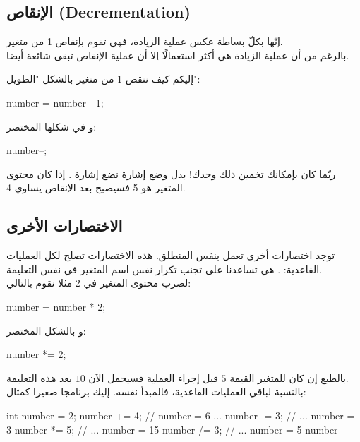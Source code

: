\subsection{الإنقاص (\textenglish{Decrementation})}

إنّها بكلّ بساطة عكس عملية الزيادة، فهي تقوم بإنقاص 1 من متغير.\\
بالرغم من أن عملية الزيادة هي أكثر استعمالًا إلا أن عملية الإنقاص تبقى شائعة أيضا.

إليكم كيف ننقص 1 من متغير بالشكل "الطويل":

\begin{Csource}
  number = number - 1;
\end{Csource}

و في شكلها المختصر:

\begin{Csource}
  number--;
\end{Csource}

ربّما كان بإمكانك تخمين ذلك وحدك! بدل وضع إشارة
\InlineCode{++}
نضع إشارة
\InlineCode{{-}{-}}.
إذا كان محتوى المتغير هو 5 فسيصبح بعد الإنقاص يساوي 4.

\subsection{الاختصارات الأخرى}

توجد اختصارات أخرى تعمل بنفس المنطلق. هذه الاختصارات تصلح لكل العمليات القاعدية:
\InlineCode{+}
\InlineCode{-}
\InlineCode{*}
\InlineCode{/}
\InlineCode{\%}.
هي تساعدنا على تجنب تكرار نفس اسم المتغير في نفس التعليمة.\\
لضرب محتوى المتغير في 2 مثلا نقوم بالتالي:

\begin{Csource}
  number = number * 2;
\end{Csource}

و بالشكل المختصر:

\begin{Csource}
  number *= 2;
\end{Csource}

بالطبع إن كان للمتغير القيمة $ 5 $ قبل إجراء العملية فسيحمل الآن $ 10 $ بعد هذه التعليمة.\\
بالنسبة لباقي العمليات القاعدية، فالمبدأ نفسه. إليك برنامجا صغيرا كمثال:

\begin{Csource}
int number = 2;
number += 4; // number = 6 ...
number -= 3; // ... number = 3
number *= 5; // ... number = 15
number /= 3; // ... number = 5
number %
\end{Csource}

